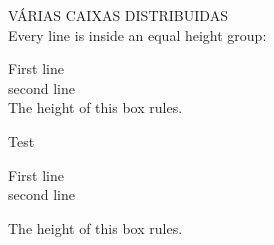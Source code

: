 \cleardoublepage\documentclass[../main.tex]{subfiles}
\begin{document}
VÁRIAS CAIXAS DISTRIBUIDAS\\
Every line is inside an equal height group:
\begin{tcbraster}[raster equal height=rows,
title=Box \thetcbrasternum,
enhanced,size=small,colframe=red!50!black,colback=red!10!white]
\begin{tcolorbox}First line\\second line\\
The height of this box rules.\end{tcolorbox}
\begin{tcolorbox}Test\end{tcolorbox}
\begin{tcolorbox}
First line\\second line\end{tcolorbox}
\begin{tcolorbox}The height of this box rules.\end{tcolorbox}
\end{tcbraster}
\end{document}
